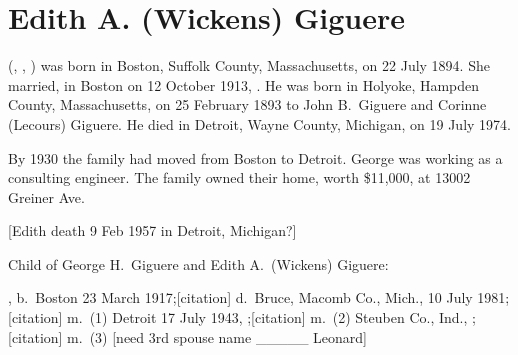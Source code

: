 \section{Edith A. (Wickens) Giguere}

 (, , ) was born in Boston, Suffolk County, Massachusetts, on 22 July 1894.\cite{Edith4WickensBirth} She married, in Boston on 12 October 1913, .\cite{Edith4WickensMarriage} He was born in Holyoke, Hampden County, Massachusetts, on 25 February 1893 to John B.\ Giguere and Corinne (Lecours) Giguere.\cite{GeorgeGiguereBirth} He died in Detroit, Wayne County, Michigan, on 19 July 1974.\cite{GeorgeGiguereDeath}

By 1930 the family had moved from Boston to Detroit. George was working as a consulting engineer. The family owned their home, worth \$11,000, at 13002 Greiner Ave.\cite{Census1930GeorgeGiguere}

[Edith death 9 Feb 1957 in Detroit, Michigan?]

\begin{KidsIntro}
	Child of George H.\ Giguere and Edith A.\ (Wickens) Giguere:
\end{KidsIntro}

\begin{Kids}
	, b.\ Boston 23 March 1917;\cite{Doris5GiguereBirth}[citation] d.\ Bruce, Macomb Co., Mich., 10 July 1981;\cite{Doris5GiguereDeath}[citation] m.\ (1) Detroit 17 July 1943, ;\cite{RobertMayMarriage}[citation] m.\ (2) Steuben Co., Ind., ;\cite{JohnMeyersMarriage}[citation] m.\ (3) [need 3rd spouse name \_\_\_\_\_ Leonard]
\end{Kids}